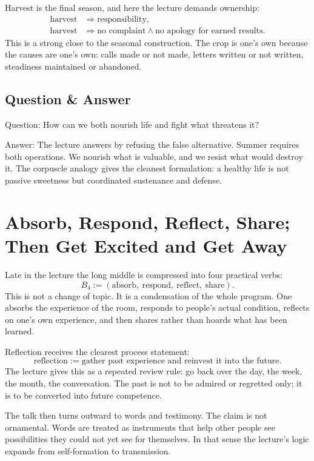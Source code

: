 Harvest is the final season, and here the lecture demands ownership:
\begin{align}
\text{harvest} &\Rightarrow \text{responsibility},\\
\text{harvest} &\Rightarrow \text{no complaint} \land \text{no apology for earned results}.
\end{align}
This is a strong close to the seasonal construction. The crop is one's own because the causes are one's own: calls made or not made, letters written or not written, steadiness maintained or abandoned.

\subsection{Question \& Answer}

Question: How can we both nourish life and fight what threatens it?

Answer: The lecture answers by refusing the false alternative. Summer requires both operations. We nourish what is valuable, and we resist what would destroy it. The corpuscle analogy gives the cleanest formulation: a healthy life is not passive sweetness but coordinated sustenance and defense.

\section{Absorb, Respond, Reflect, Share; Then Get Excited and Get Away}

Late in the lecture the long middle is compressed into four practical verbs:
\begin{equation}
B_4 := (\text{absorb},\ \text{respond},\ \text{reflect},\ \text{share}).
\end{equation}
This is not a change of topic. It is a condensation of the whole program. One absorbs the experience of the room, responds to people's actual condition, reflects on one's own experience, and then shares rather than hoards what has been learned.

Reflection receives the clearest process statement:
\begin{equation}
\text{reflection} := \text{gather past experience and reinvest it into the future}.
\end{equation}
The lecture gives this as a repeated review rule: go back over the day, the week, the month, the conversation. The past is not to be admired or regretted only; it is to be converted into future competence.

The talk then turns outward to words and testimony. The claim is not ornamental. Words are treated as instruments that help other people see possibilities they could not yet see for themselves. In that sense the lecture's logic expands from self-formation to transmission.

